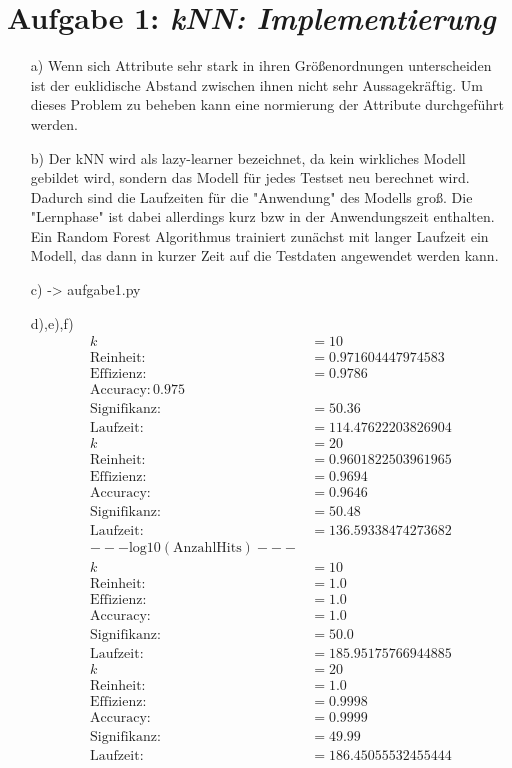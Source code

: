\section*{Aufgabe 1: \emph{kNN: Implementierung}}
\begin{itemize}
\item[a)] Wenn sich Attribute sehr stark in ihren Größenordnungen unterscheiden ist der euklidische Abstand zwischen ihnen nicht sehr Aussagekräftig. Um dieses Problem zu beheben kann eine normierung der Attribute durchgeführt werden.

\item[b)] Der kNN wird als lazy-learner bezeichnet, da kein wirkliches Modell gebildet wird, sondern das Modell für jedes Testset neu berechnet wird. Dadurch sind die Laufzeiten für die "Anwendung" des Modells groß. Die "Lernphase" ist dabei allerdings kurz bzw in der Anwendungszeit enthalten. Ein Random Forest Algorithmus trainiert zunächst mit langer Laufzeit ein Modell, das dann in kurzer Zeit auf die Testdaten angewendet werden kann.

\item[c)] -> aufgabe1.py
\item[d),e),f)]
\begin{align*}
	k &=10 \\
	\mathrm{Reinheit: } &= 0.971604447974583 \\
	\mathrm{Effizienz: } &=0.9786 \\
	\mathrm{Accuracy : } 0.975 \\
	\mathrm{Signifikanz: } &= 50.36 \\
	\mathrm{Laufzeit : } &= 114.47622203826904 \\
	k &=20 \\
	\mathrm{Reinheit: } &=  0.9601822503961965 \\
	\mathrm{Effizienz: } &= 0.9694\\ 
	\mathrm{Accuracy: } &= 0.9646\\
	\mathrm{Signifikanz: } &=  50.48 \\
	\mathrm{Laufzeit: } &=136.59338474273682 \\
	\mathrm{---log10(AnzahlHits)---}\\
	k &=10 \\
	\mathrm{Reinheit: } &=1.0\\
	\mathrm{Effizienz: } &=1.0\\
	\mathrm{Accuracy: } &=1.0\\
	\mathrm{Signifikanz: } &=50.0 \\
	\mathrm{Laufzeit :} &= 185.95175766944885 \\
	k &=20 \\
	\mathrm{Reinheit: }&= 1.0 \\
	\mathrm{Effizienz: }&= 0.9998 \\
	\mathrm{Accuracy: }&=  0.9999 \\
	\mathrm{Signifikanz: }&=  49.99 \\
	\mathrm{Laufzeit: }&= 186.45055532455444 \\
\end{align*}


\end{itemize}
